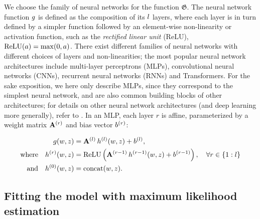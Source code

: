\documentclass[../thesis.tex]{subfiles}
\begin{document}
We choose the family of neural networks for the function $\mathfrak{G}$. The neural network function $g$ is defined as the composition of its $l$ layers, where each layer is in turn defined by a simpler function followed by an element-wise non-linearity or activation function, such as the \textit{rectified linear unit} (ReLU), $\mathrm{ReLU}(a) = \mathrm{max}(0, a)$. There exist different families of neural networks with different choices of layers and non-linearities; the most popular neural network architectures include multi-layer perceptrons (MLPs), convolutional neural networks (CNNs), recurrent neural networks (RNNs) and Transformers. For the sake exposition, we here only describe MLPs, since they correspond to the simplest neural network, and are also common building blocks of other architectures; for details on other neural network architectures (and deep learning more generally), refer to \citet{goodfellowDeepLearning2016}. In an MLP, each layer $r$ is affine, parameterized by a weight matrix $\mymatrix{a}^{(\mycnt{r})}$ and bias vector $b^{(r)}$:

\begin{align*}
    \myfunc{g}(\myvect{w}, \myvect{z}) &= \mymatrix{a}^{(\mycnt{l})} \, \myfunc{h}^{(\mycnt{l})} (\myvect{w}, \myvect{z}) + \myvect{b}^{(\mycnt{l})}, \\
    \mathrm{where} \quad \myfunc{h}^{(\mycnt{r})} (\myvect{w}, \myvect{z}) &= \mathrm{ReLU} \left( \mymatrix{a}^{(\mycnt{r-1})} \, \myfunc{h}^{(\mycnt{r-1})} (\myvect{w}, \myvect{z}) + \myvect{b}^{(\mycnt{r-1})} \right), \quad \forall r \in \{1:\mycnt{l}\}\\
    \mathrm{and} \quad \myfunc{h}^{(\mycnt{0})} (\myvect{w}, \myvect{z}) &= \mathrm{concat}(\myvect{w}, \myvect{z}).
\end{align*}

\subsection{Fitting the model with maximum likelihood estimation}
\end{document}
